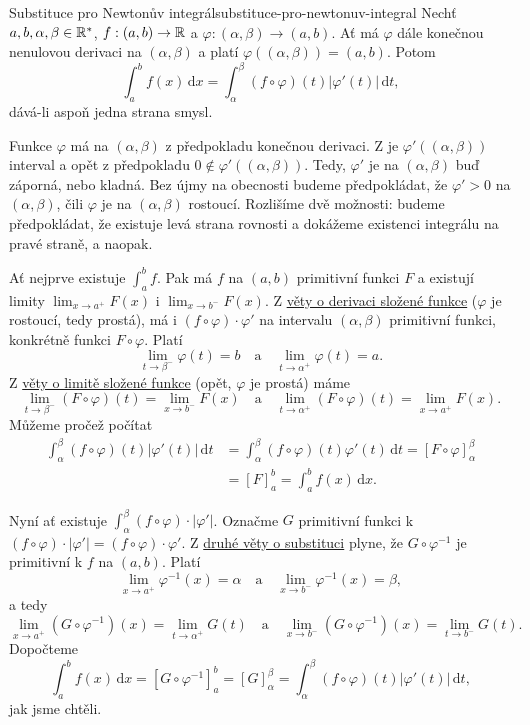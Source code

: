 \begin{theorem}{Substituce pro Newtonův integrál}{substituce-pro-newtonuv-integral}
 Nechť $a,b,\alpha,\beta \in \mathbb{R}^{*}$, $f:(a,b) \to \mathbb{R}$ a $\varphi:(\alpha,\beta)
 \to (a,b)$. Ať má $\varphi$ dále konečnou nenulovou derivaci na
 $(\alpha,\beta)$ a platí $\varphi((\alpha,\beta)) = (a,b)$. Potom
 \[
  \int_{a}^{b} f(x) \, \mathrm{d}x = \int_{\alpha}^{\beta} (f \circ \varphi)(t)
  |\varphi'(t)|\,
  \mathrm{d}t,
 \]
 dává-li aspoň jedna strana smysl.
\end{theorem}
\begin{thmproof}
 Funkce $\varphi$ má na $(\alpha,\beta)$ z předpokladu konečnou derivaci. Z
  je $\varphi'((\alpha,\beta))$ interval a opět z
 předpokladu $0 \notin \varphi'((\alpha,\beta))$. Tedy, $\varphi'$ je na
 $(\alpha,\beta)$ buď záporná, nebo kladná. Bez újmy na obecnosti budeme
 předpokládat, že $\varphi' > 0$ na $(\alpha,\beta)$, čili $\varphi$ je na
 $(\alpha,\beta)$ rostoucí. Rozlišíme dvě možnosti: budeme předpokládat, že
 existuje levá strana rovnosti a dokážeme existenci integrálu na pravé straně, a
 naopak.

 Ať nejprve existuje $\int_{a}^{b} f$. Pak má $f$ na $(a,b)$ primitivní funkci
 $F$ a existují limity $\lim_{x \to a^{+}} F(x)$ i $\lim_{x \to b^{-}} F(x)$. Z
 \hyperref[thm:derivace-slozene-funkce]{věty o derivaci složené funkce}
 ($\varphi$ je rostoucí, tedy prostá), má i $(f \circ \varphi) \cdot \varphi'$
 na intervalu $(\alpha,\beta)$ primitivní funkci, konkrétně funkci $F \circ
 \varphi$. Platí
 \[
  \lim_{t \to \beta^{-}} \varphi(t) = b \quad \text{a} \quad \lim_{t \to \alpha
  ^{+}} \varphi(t) = a.
 \]
 Z \hyperref[thm:limita-slozene-funkce]{věty o limitě složené funkce} (opět,
 $\varphi$ je prostá) máme
 \[
  \lim_{t \to \beta^{-}} (F \circ \varphi)(t) = \lim_{x \to b^{-}} F(x) \quad
  \text{a} \quad \lim_{t \to \alpha ^{+}} (F \circ \varphi)(t) = \lim_{x \to
  a^{+}} F(x).
 \]
 Můžeme pročež počítat
 \begin{align*}
  \int_{\alpha}^{\beta} (f \circ \varphi)(t)|\varphi'(t)| \, \mathrm{d}t 
  &= \int_{\alpha}^{\beta} (f \circ \varphi)(t) \varphi'(t) \, \mathrm{d}t =
  [F \circ \varphi]_{\alpha}^{\beta}\\
  &= [F]_a^{b} = \int_{a}^{b} f(x) \, \mathrm{d}x.
 \end{align*}

 Nyní ať existuje $\int_{\alpha}^{\beta} (f \circ \varphi) \cdot |\varphi'|$.
 Označme $G$ primitivní funkci k $(f \circ \varphi) \cdot |\varphi'| = (f \circ
 \varphi) \cdot \varphi'$. Z \hyperref[thm:druha-o-substituci]{druhé věty o
 substituci} plyne, že $G \circ \varphi ^{-1}$ je primitivní k $f$ na $(a,b)$.
 Platí
 \[
  \lim_{x \to a^{+}} \varphi ^{-1}(x) = \alpha \quad \text{a} \quad \lim_{x \to
  b^{-}} \varphi ^{-1}(x) = \beta,
 \]
 a tedy
 \[
  \lim_{x \to a^{+}} (G \circ \varphi ^{-1})(x) = \lim_{t \to \alpha ^{+}}
  G(t) \quad \text{a} \quad \lim_{x \to b^{-}} (G \circ \varphi ^{-1})(x) =
  \lim_{t \to b^{-}} G(t).
 \]
 Dopočteme
 \[
  \int_{a}^{b} f(x) \, \mathrm{d}x = [G \circ \varphi ^{-1}]_a^{b} =
  [G]_{\alpha}^{\beta} = \int_{\alpha}^{\beta} (f \circ \varphi)(t)|\varphi'(t)|
  \, \mathrm{d}t,
 \]
 jak jsme chtěli.
\end{thmproof}

